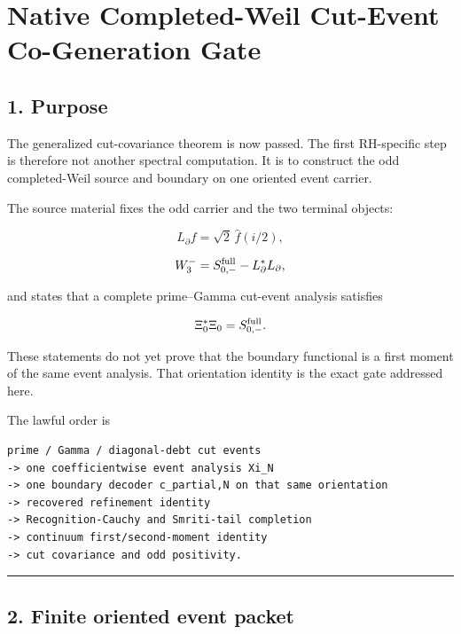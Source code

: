 \hypertarget{native-completed-weil-cut-event-co-generation-gate}{%
\chapter{Native Completed-Weil Cut-Event Co-Generation Gate}\label{native-completed-weil-cut-event-co-generation-gate}}

\hypertarget{purpose}{%
\section{1. Purpose}\label{purpose}}

The generalized cut-covariance theorem is now passed. The first RH-specific
step is therefore not another spectral computation. It is to construct the
odd completed-Weil source and boundary on one oriented event carrier.

The source material fixes the odd carrier and the two terminal objects:

\[
L_\partial f=\sqrt2\,\widehat f(i/2),
\]

\[
W_3^-
=S_{0,-}^{\rm full}-L_\partial^*L_\partial,
\]

and states that a complete prime--Gamma cut-event analysis satisfies

\[
\Xi_0^*\Xi_0=S_{0,-}^{\rm full}.
\]

These statements do not yet prove that the boundary functional is a first
moment of the same event analysis. That orientation identity is the exact gate
addressed here.

The lawful order is

\begin{verbatim}
prime / Gamma / diagonal-debt cut events
-> one coefficientwise event analysis Xi_N
-> one boundary decoder c_partial,N on that same orientation
-> recovered refinement identity
-> Recognition-Cauchy and Smriti-tail completion
-> continuum first/second-moment identity
-> cut covariance and odd positivity.
\end{verbatim}

\begin{center}\rule{0.5\linewidth}{0.5pt}\end{center}

\hypertarget{finite-oriented-event-packet}{%
\section{2. Finite oriented event packet}\label{finite-oriented-event-packet}}

